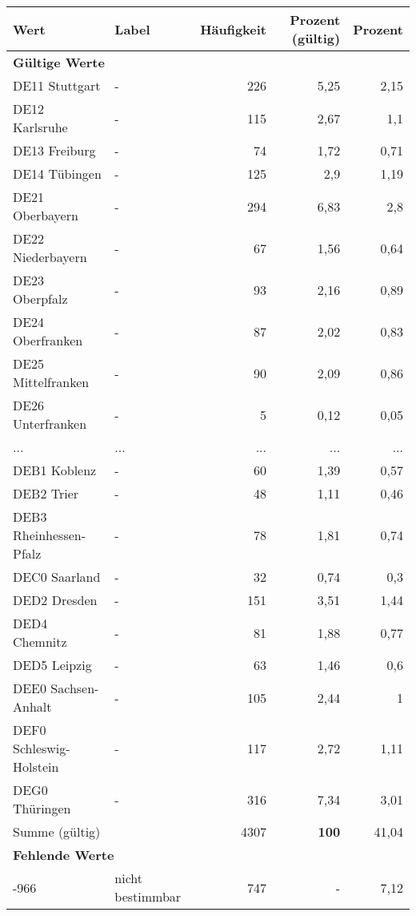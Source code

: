      \begin{longtable}{Xlrrr}
     \toprule
     \textbf{Wert} & \textbf{Label} & \textbf{Häufigkeit} & \textbf{Prozent (gültig)} & \textbf{Prozent} \\
     \endhead
     \midrule
     \multicolumn{5}{l}{\textbf{Gültige Werte}}\\
        \multicolumn{1}{X}{DE11 Stuttgart} & - & 226 & 5,25 & 2,15 \\
        \multicolumn{1}{X}{DE12 Karlsruhe} & - & 115 & 2,67 & 1,1 \\
        \multicolumn{1}{X}{DE13 Freiburg} & - & 74 & 1,72 & 0,71 \\
        \multicolumn{1}{X}{DE14 Tübingen} & - & 125 & 2,9 & 1,19 \\
        \multicolumn{1}{X}{DE21 Oberbayern} & - & 294 & 6,83 & 2,8 \\
        \multicolumn{1}{X}{DE22 Niederbayern} & - & 67 & 1,56 & 0,64 \\
        \multicolumn{1}{X}{DE23 Oberpfalz} & - & 93 & 2,16 & 0,89 \\
        \multicolumn{1}{X}{DE24 Oberfranken} & - & 87 & 2,02 & 0,83 \\
        \multicolumn{1}{X}{DE25 Mittelfranken} & - & 90 & 2,09 & 0,86 \\
        \multicolumn{1}{X}{DE26 Unterfranken} & - & 5 & 0,12 & 0,05 \\
       ... & ... & ... & ... & ... \\
        \multicolumn{1}{X}{DEB1 Koblenz} & - & 60 & 1,39 & 0,57 \\
        \multicolumn{1}{X}{DEB2 Trier} & - & 48 & 1,11 & 0,46 \\
        \multicolumn{1}{X}{DEB3 Rheinhessen-Pfalz} & - & 78 & 1,81 & 0,74 \\
        \multicolumn{1}{X}{DEC0 Saarland} & - & 32 & 0,74 & 0,3 \\
        \multicolumn{1}{X}{DED2 Dresden} & - & 151 & 3,51 & 1,44 \\
        \multicolumn{1}{X}{DED4 Chemnitz} & - & 81 & 1,88 & 0,77 \\
        \multicolumn{1}{X}{DED5 Leipzig} & - & 63 & 1,46 & 0,6 \\
        \multicolumn{1}{X}{DEE0 Sachsen-Anhalt} & - & 105 & 2,44 & 1 \\
        \multicolumn{1}{X}{DEF0 Schleswig-Holstein} & - & 117 & 2,72 & 1,11 \\
        \multicolumn{1}{X}{DEG0 Thüringen} & - & 316 & 7,34 & 3,01 \\
     \midrule
      \multicolumn{2}{l}{Summe (gültig)} & 4307 &
      \textbf{100} &
         41,04 \\
     \multicolumn{5}{l}{\textbf{Fehlende Werte}}\\
       -966 & nicht bestimmbar & 747 & - & 7,12 \\


\end{longtable}
